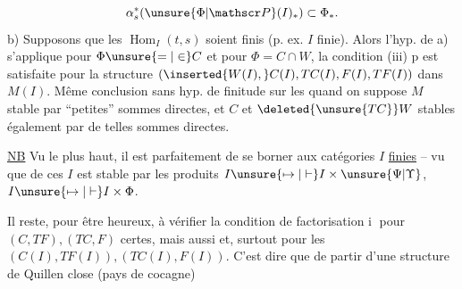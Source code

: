 \[
 \alpha_{s}^{*}(\unsure{\Phi|\mathscr P}(I)_{*})\subset\Phi_{*}.
\]
b) Supposons que les $\operatorname{Hom}_{I}(t,s)$ soient finis (p. ex. $I$ finie). Alors  l'hyp. de a) s'applique pour $\Phi\unsure{=|\in}C$ et pour $\Phi=C\cap W$,   la  condition (iii) p  est satisfaite pour la structure $(\inserted{W(I),}C(I),TC(I),F(I),TF(I))$ dans $M(I)$. Même conclusion sans hyp. de finitude sur les   quand on suppose $M$ stable par ``petites'' sommes directes, et $C$ et $\deleted{\unsure{TC}}W$ stables également par de telles sommes directes.

\uline{NB} Vu le  plus haut, il est parfaitement  de se borner  aux catégories $I$ \uline{finies} -- vu que   de ces $I$ est stable par les produits $I\unsure{\mapsto|\vdash}I\times\unsure{\Psi|\Upsilon}$, $I\unsure{\mapsto|\vdash}I\times\Phi$.

Il reste, pour être heureux, à vérifier la condition de factorisation \textcircled{\scriptsize i} pour $(C,TF),(TC,F)$ certes, mais aussi et, surtout pour les $(C(I),TF(I)),(TC(I),F(I))$. C'est dire que de partir  d'une structure de Quillen close (pays de cocagne)
